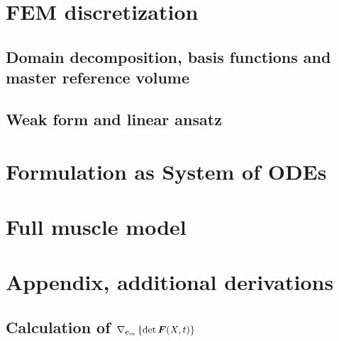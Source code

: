 \documentclass[a4paper,11pt]{article}
\begin{document}
\section{FEM discretization}
\subsection{Domain decomposition, basis functions and master reference volume}


\subsection{Weak form and linear ansatz}


\section{Formulation as System of ODEs}\label{sec:odeform}


\section{Full muscle model}


\newpage
\section{Appendix, additional derivations}

\subsection{Calculation of $\nabla_{\boldsymbol{c}_m}\left\{\det \boldsymbol{F}(X,t)\right\}$}




\end{document}
